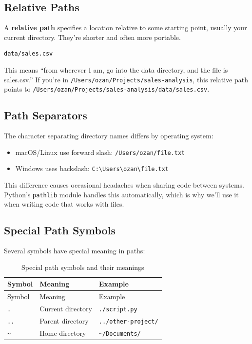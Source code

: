 \documentclass[
  letterpaper,
  DIV=11,
  numbers=noendperiod]{scrreprt}
\providecommand{\tightlist}{%
  \setlength{\itemsep}{0pt}\setlength{\parskip}{0pt}}
\begin{document}
\subsection{Relative Paths}\label{relative-paths}

A \textbf{relative path} specifies a location relative to some starting
point, usually your current directory. They're shorter and often more
portable.

\begin{verbatim}
data/sales.csv
\end{verbatim}

This means ``from wherever I am, go into the data directory, and the
file is sales.csv.'' If you're in
\texttt{/Users/ozan/Projects/sales-analysis}, this relative path points
to \texttt{/Users/ozan/Projects/sales-analysis/data/sales.csv}.

\subsection{Path Separators}\label{path-separators}

The character separating directory names differs by operating system:

\begin{itemize}
\tightlist
\item
  macOS/Linux use forward slash: \texttt{/Users/ozan/file.txt}
\item
  Windows uses backslash:
  \texttt{C:\textbackslash{}Users\textbackslash{}ozan\textbackslash{}file.txt}
\end{itemize}

This difference causes occasional headaches when sharing code between
systems. Python's \texttt{pathlib} module handles this automatically,
which is why we'll use it when writing code that works with files.

\subsection{Special Path Symbols}\label{special-path-symbols}

Several symbols have special meaning in paths:

\begin{longtable}[]{@{}lll@{}}
\caption{Special path symbols and their
meanings}\label{tbl-path-symbols}\tabularnewline
\toprule\noalign{}
Symbol & Meaning & Example \\
\midrule\noalign{}
\endfirsthead
\toprule\noalign{}
Symbol & Meaning & Example \\
\midrule\noalign{}
\endhead
\bottomrule\noalign{}
\endlastfoot
\texttt{.} & Current directory & \texttt{./script.py} \\
\texttt{..} & Parent directory & \texttt{../other-project/} \\
\texttt{\textasciitilde{}} & Home directory &
\texttt{\textasciitilde{}/Documents/} \\
\end{longtable}
\end{document}
